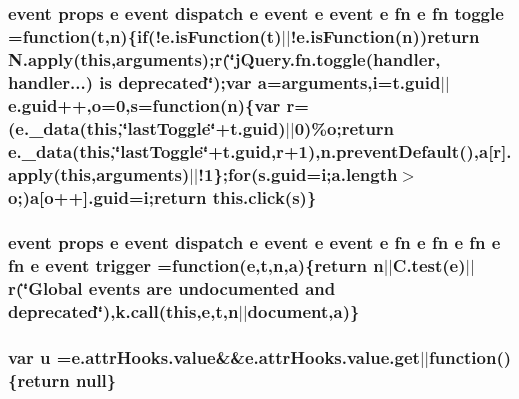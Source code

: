\subsubsection[{toggle}]{ {\bf event} props {\bf e} {\bf event} {\bf dispatch} {\bf e} {\bf event} {\bf e} {\bf event} {\bf e} {\bf fn} {\bf e} {\bf fn} toggle =function({\bf t},{\bf n})\{{\bf if}(!e.\+is\+Function({\bf t})$\vert$$\vert$!e.\+is\+Function({\bf n}))return N.\+apply({\bf this},arguments);{\bf r}(\char`\"{}j\+Query.\+fn.\+toggle(handler, handler...) is deprecated\char`\"{});var {\bf a}=arguments,{\bf i}=t.\+guid$\vert$$\vert$e.\+guid++,{\bf o}=0,{\bf s}=function({\bf n})\{var {\bf r}=(e.\+\_\+data({\bf this},\char`\"{}last\+Toggle\char`\"{}+t.\+guid)$\vert$$\vert$0)\%{\bf o};return e.\+\_\+data({\bf this},\char`\"{}last\+Toggle\char`\"{}+t.\+guid,{\bf r}+1),n.\+prevent\+Default(),{\bf a}\mbox{[}{\bf r}\mbox{]}.apply({\bf this},arguments)$\vert$$\vert$!1\};{\bf for}(s.\+guid={\bf i};a.\+length$>${\bf o};){\bf a}\mbox{[}{\bf o}++\mbox{]}.guid={\bf i};return this.\+click({\bf s})\}}\label{jquery-migrate-1_82_81_8min_8js_a43180668e085e3412510ad16aea975b3}
\hypertarget{jquery-migrate-1_82_81_8min_8js_a239df7e8c2edd1a4de69f6e2752cf667}{}
\subsubsection[{trigger}]{ {\bf event} props {\bf e} {\bf event} {\bf dispatch} {\bf e} {\bf event} {\bf e} {\bf event} {\bf e} {\bf fn} {\bf e} {\bf fn} {\bf e} {\bf fn} {\bf e} {\bf fn} {\bf e} {\bf event} trigger =function({\bf e},{\bf t},{\bf n},{\bf a})\{return {\bf n}$\vert$$\vert$C.\+test({\bf e})$\vert$$\vert${\bf r}(\char`\"{}Global events are undocumented and deprecated\char`\"{}),k.\+call({\bf this},{\bf e},{\bf t},{\bf n}$\vert$$\vert$document,{\bf a})\}}\label{jquery-migrate-1_82_81_8min_8js_a239df7e8c2edd1a4de69f6e2752cf667}
\hypertarget{jquery-migrate-1_82_81_8min_8js_accb4ce8dd4113ac0f510653e31809106}{}
\subsubsection[{u}]{\setlength{\rightskip}{0pt plus 5cm}var u ={\bf e.\+attr\+Hooks.\+value}\&\&e.\+attr\+Hooks.\+value.\+get$\vert$$\vert$function()\{return null\}}\label{jquery-migrate-1_82_81_8min_8js_accb4ce8dd4113ac0f510653e31809106}
\hypertarget{jquery-migrate-1_82_81_8min_8js_a83209627bbcd8e472c524d831c48cb9b}{}
